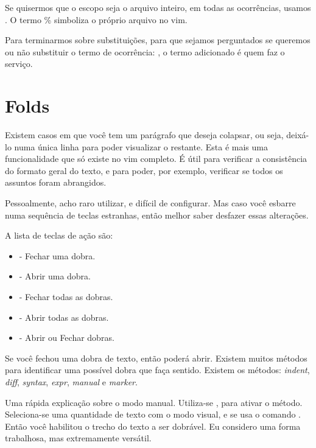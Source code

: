 Se quisermos que o escopo seja o arquivo inteiro, em todas as ocorrências, usamos .
O termo \% simboliza o próprio arquivo no vim.



Para terminarmos sobre substituições, para que sejamos perguntados se queremos ou não substituir o termo de ocorrência:
, o termo  adicionado é quem faz o serviço.

\section{Folds}
Existem casos em que você tem um parágrafo que deseja colapsar, ou seja, deixá-lo numa única linha para poder visualizar o restante.
Esta é mais uma funcionalidade que só existe no vim completo.
É útil para verificar a consistência do formato geral do texto, e para poder, por exemplo, verificar se todos os assuntos foram abrangidos.

Pessoalmente, acho raro utilizar, e difícil de configurar.
Mas caso você esbarre numa sequência de teclas estranhas, então melhor saber desfazer essas alterações.

A lista de teclas de ação são:
\begin{itemize}
    \item {} - Fechar uma dobra.
    \item {} - Abrir uma dobra.
    \item {} - Fechar todas as dobras.
    \item {} - Abrir todas as dobras.
    \item {} - Abrir ou Fechar dobras.
\end{itemize}

Se você fechou uma dobra de texto, então poderá abrir.
Existem muitos métodos para identificar uma possível dobra que faça sentido.
Existem os métodos: \textit{indent}, \textit{diff}, \textit{syntax}, \textit{expr}, \textit{manual} e \textit{marker}.

Uma rápida explicação sobre o modo manual.
Utiliza-se , para ativar o método.
Seleciona-se uma quantidade de texto com o modo visual, e se usa o comando .
Então você habilitou o trecho do texto a ser dobrável.
Eu considero uma forma trabalhosa, mas extremamente versátil.

